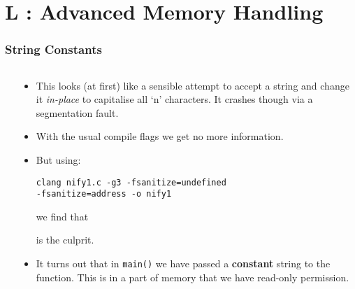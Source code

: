 \section{L : Advanced Memory Handling}
\label{chap:advmem}


\begin{frame}[fragile]
\frametitle{String Constants}
\begin{columns}[T]

\begin{column}{0.35\textwidth}

\end{column}

\pause
\begin{column}{0.55\textwidth}
\begin{itemize}[<+->]
\item This looks (at first) like a sensible attempt to accept a string and change it {\em in-place} to capitalise all `n' characters.
It crashes though via a segmentation fault.
\item With the usual compile flags we get no more information.
\item But using:
\begin{verbatim}
clang nify1.c -g3 -fsanitize=undefined
-fsanitize=address -o nify1
\end{verbatim}
we find that

is the culprit.
\item It turns out that in \verb^main()^ we have passed a {\bf constant} string to the function. This is in a part of memory that we have read-only permission.
\end{itemize}
\end{column}

\end{columns}
\end{frame}


